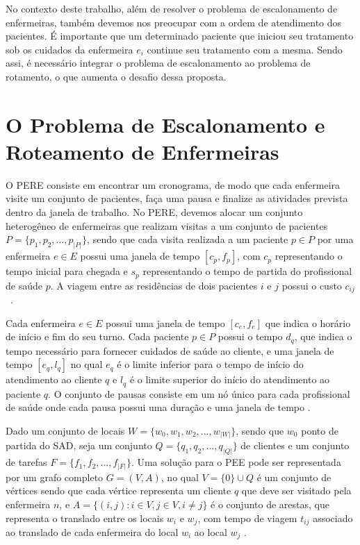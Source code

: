 No contexto deste trabalho, al\'em de resolver o problema de escalonamento de enfermeiras, tamb\'em devemos nos preocupar com a ordem de atendimento dos pacientes. \'E importante que um determinado paciente que iniciou seu tratamento sob os cuidados da enfermeira $e_i$ continue seu tratamento com a mesma. Sendo assi, \'e necess\'ario integrar o problema de escalonamento ao problema de rotamento, o que aumenta o desafio dessa proposta.

\section{O Problema de Escalonamento e Roteamento de Enfermeiras}

O \ac{PERE} consiste em  encontrar um cronograma, de modo que cada enfermeira visite um conjunto de pacientes, faça uma pausa e finalize as atividades prevista dentro da janela de trabalho. No \ac{PERE}, devemos alocar um conjunto heterogêneo de enfermeiras  que realizam visitas a um conjunto de pacientes  $P = \{ p_1, p_2, \ldots, p_{|P|} \}$, sendo que cada visita realizada a um paciente $p \in P$ por uma enfermeira $e \in E$ possui uma janela de tempo $[c_{p}, f_{p}]$, com $c_{p}$ representando o tempo inicial para chegada e $s_{p}$ representando o tempo de partida do profissional de saúde $p$. A viagem entre as residências de dois pacientes $i$ e $j$  possui o custo $c_{ij}$~\cite{rasmussenm:2012}.   

Cada enfermeira $e \in E$ possui uma janela de tempo $[c_e, f_e]$ que indica o horário de início e fim do seu turno.  Cada paciente $p \in P$ possui o tempo $d_q$, que indica o tempo necessário para fornecer cuidados de saúde ao cliente, e uma janela de tempo $[e_q,l_q]$ no qual $e_q$ é o limite inferior para o tempo de início do atendimento ao cliente $q$ e  $l_q$ é o limite superior do início do atendimento ao paciente $q$. O conjunto de pausas consiste em um nó único para cada profissional de saúde onde cada pausa possui uma duração e uma janela de tempo \cite{cheng:98}.

Dado um conjunto de locais $W = \{w_0, w_1, w_2, ..., w_{|W|}\}$, sendo que $w_0$ ponto de partida do \ac{SAD}, seja um conjunto $Q = \{q_1, q_2, ..., q_{|Q|}\}$ de clientes e um conjunto de tarefas $F = \{ f_1, f_2, ..., f_{|F|}\}$.  
Uma solução para o \ac{PEE} pode ser representada por um grafo completo $G = (V, A)$, no qual $V = \{0\} \cup Q$ é um conjunto de vértices sendo que cada vértice representa um cliente $q$ que deve ser visitado pela enfermeira $n$, e $A = \{ (i,j): i \in V, j \in V, i \neq j \}$ é o conjunto de arestas, que representa o translado entre os locais $w_i$ e $w_j$, com tempo de viagem $t_{ij}$ associado ao translado de cada enfermeira do local $w_i$ ao local $w_j$ \cite{mansini:2016}.

